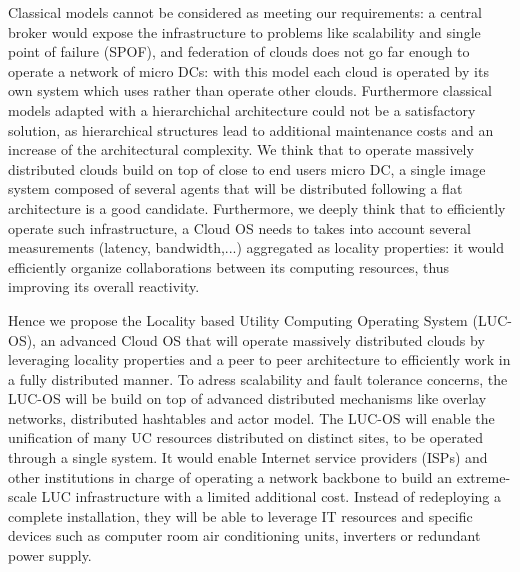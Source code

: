 Classical models cannot be considered as meeting our requirements: a central 
broker would expose the infrastructure to problems like scalability and single 
point of failure (SPOF), and federation of clouds does not go far enough to 
operate a network of micro DCs: with this model each cloud is operated by its 
own system which uses rather than operate other clouds. Furthermore classical
models adapted with a hierarchichal architecture could not be a satisfactory 
solution, as hierarchical structures lead to additional maintenance costs and an
increase of the architectural complexity. We think that to operate massively 
distributed clouds build on top of close to end users micro DC, a single image
system composed of several agents that will be distributed following a flat 
architecture is a good candidate. Furthermore, we deeply think that to 
efficiently operate such infrastructure, a Cloud OS needs to takes into account 
several measurements (latency, bandwidth,...) aggregated as locality properties:
it would efficiently organize collaborations between its computing resources,
thus improving its overall reactivity. 

Hence we propose the Locality based Utility Computing Operating System (LUC-OS),
an advanced Cloud OS that will operate massively distributed clouds by 
leveraging locality properties and a peer to peer architecture to efficiently 
work in a fully distributed manner. To adress scalability and fault tolerance 
concerns, the LUC-OS will be build on top of advanced distributed mechanisms 
like overlay networks, distributed hashtables and actor model. The LUC-OS will 
enable the unification of many UC resources distributed on distinct sites, to be
operated through a single system. It would enable Internet service providers 
(ISPs) and other institutions in charge of operating a network backbone to build
an extreme-scale LUC infrastructure with a limited additional cost. Instead of 
redeploying a complete installation, they will be able to leverage IT resources 
and specific devices such as computer room air conditioning units, inverters or 
redundant power supply.

